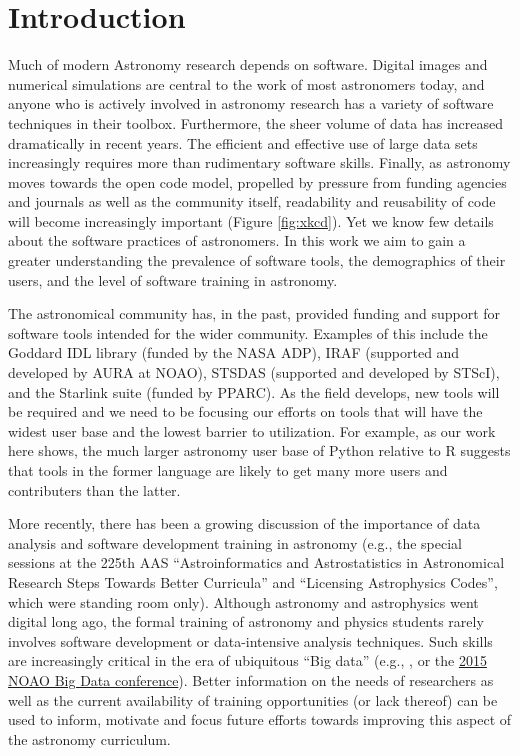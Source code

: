 \section{Introduction}
\label{sec:intro}

Much of modern Astronomy research depends on software. Digital images and numerical simulations are central to the work of most astronomers today, and anyone who is actively involved in astronomy research has a variety of software techniques in their toolbox. Furthermore, the sheer volume of data has increased dramatically in recent years. The efficient and effective use of large data sets increasingly requires more than rudimentary software skills. Finally, as astronomy moves towards the open code model, propelled by pressure from funding agencies and journals as well as the community itself, readability and reusability of code will become increasingly important (Figure \ref{fig:xkcd}). Yet we know few details about the software practices of astronomers. In this work we aim to gain a greater understanding the prevalence of software tools, the demographics of their users, and the level of software training in astronomy.

The astronomical community has, in the past, provided funding and support for software tools intended for the wider community. Examples of this include the Goddard IDL library (funded by the NASA ADP), IRAF (supported and developed by AURA at NOAO), STSDAS (supported and developed by STScI), and the Starlink suite (funded by PPARC). As the field develops, new tools will be required and we need to be focusing our efforts on tools that will have the widest user base and the lowest barrier to utilization. For example, as our work here shows, the much larger astronomy user base of Python relative to R suggests that tools in the former language are likely to get many more users and contributers than the latter. 

More recently, there has been a growing discussion of the importance of data analysis and software development training in astronomy (e.g., the special sessions at the 225th AAS ``Astroinformatics and Astrostatistics in Astronomical Research Steps Towards Better Curricula'' and ``Licensing Astrophysics Codes'', which were standing room only). Although astronomy and astrophysics went digital long ago, the formal training of astronomy and physics students rarely involves software development or data-intensive analysis techniques. Such skills are increasingly critical in the era of ubiquitous ``Big data'' (e.g., \citet{Berriman_2011}, or the \href{http://www.noao.edu/meetings/bigdata/}{2015 NOAO Big Data conference}). Better information on the needs of researchers as well as the current availability of training opportunities (or lack thereof) can be used to inform, motivate and focus future efforts towards improving this aspect of the astronomy curriculum. 

